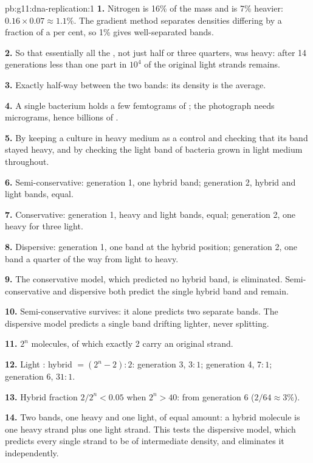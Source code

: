 \begin{solution}{pb:g11:dna-replication:1}
\textbf{1.} Nitrogen is 16\% of the mass and is 7\% heavier:
$0.16 \times 0.07 \approx 1.1\%$. The gradient method separates
densities differing by a fraction of a per cent, so 1\% gives
well-separated bands.

\textbf{2.} So that essentially all the , not just half or three
quarters, was heavy: after 14 generations less than one part in
$10^4$ of the original light strands remains.

\textbf{3.} Exactly half-way between the two bands: its density is the
average.

\textbf{4.} A single bacterium holds a few femtograms of ; the
photograph needs micrograms, hence billions of .

\textbf{5.} By keeping a culture in heavy medium as a control and
checking that its band stayed heavy, and by checking the light band
of bacteria grown in light medium throughout.

\textbf{6.} Semi-conservative: generation 1, one hybrid band;
generation 2, hybrid and light bands, equal.

\textbf{7.} Conservative: generation 1, heavy and light bands, equal;
generation 2, one heavy for three light.

\textbf{8.} Dispersive: generation 1, one band at the hybrid position;
generation 2, one band a quarter of the way from light to heavy.

\textbf{9.} The conservative model, which predicted no hybrid band, is
eliminated. Semi-conservative and dispersive both predict the single
hybrid band and remain.

\textbf{10.} Semi-conservative survives: it alone predicts two
separate bands. The dispersive model predicts a single band drifting
lighter, never splitting.

\textbf{11.} $2^n$ molecules, of which exactly 2 carry an original
strand.

\textbf{12.} Light : hybrid $= (2^n - 2) : 2$: generation 3, $3:1$;
generation 4, $7:1$; generation 6, $31:1$.

\textbf{13.} Hybrid fraction $2/2^n < 0.05$ when $2^n > 40$: from
generation 6 ($2/64 \approx 3\%$).

\textbf{14.} Two bands, one heavy and one light, of equal amount: a
hybrid molecule is one heavy strand plus one light strand. This tests
the dispersive model, which predicts every single strand to be of
intermediate density, and eliminates it independently.


\end{solution}
